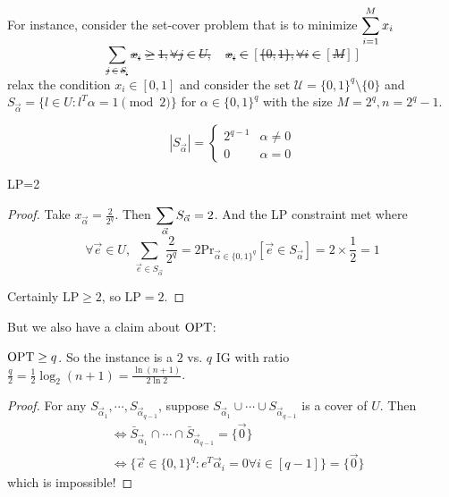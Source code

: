 For instance, consider the set-cover problem that is to minimize  $ \displaystyle\sum_{i=1}^M x_i $ \st 
\[\sum_{j\in S_i}x_i \geq 1,\forall j\in U,\quad x_i\in [\{0,1\},\forall i\in [M]]\] 
relax the condition  $ x_i\in [0,1] $ and consider the set  $ \mathcal{U}=\{0,1\}^q\setminus\{0\} $ and  $ S_{\vec{\alpha}}=\{l\in U:l^T\alpha=1\pmod 2\} $ for  $ \alpha\in \{0,1\}^q $ with the size  $  M=2^q,n=2^q-1 $. 

\[|S_{\vec{\alpha}}|=\begin{cases}
    2^{q-1}&\alpha\neq 0\\
    0&\alpha=0
\end{cases}\]

\begin{claim}
    LP=2
\end{claim}
\begin{proof}
    Take  $ x_{\vec{\alpha}}=\frac{2}{2^q} $. Then  $ \displaystyle\sum_{\vec{\alpha}}S_{\vec{\alpha}}=2 $. And the LP constraint met where
    \[\forall \vec{e}\in U,\,\sum_{\vec{e}\in S_{\vec{\alpha}}}\frac{2}{2^q}=2\mathrm{Pr}_{\vec{\alpha}\in \{0,1\}^q}[\vec{e}\in S_{\vec{\alpha}}]=2\times \frac{1}{2}=1\] 
    
    Certainly  $ \mathrm{LP} \geq 2 $, so  $ \mathrm{LP}=2 $.  
\end{proof}

But we also have a claim about  $ \mathrm{OPT} $:

\begin{claim}
     $ \mathrm{OPT} \geq q $. So the instance is a  $ 2 $ vs.  $ q $ IG with ratio  $ \frac{q}{2}=\frac{1}{2}\log_2(n+1)=\frac{\ln(n+1)}{2\ln 2} $.   
\end{claim}
\begin{proof}
    For any  $ S_{\vec{\alpha}_1},\cdots,S_{\vec{\alpha}_{q-1}} $, suppose  $ S_{\vec{\alpha}_1}\cup\cdots\cup S_{\vec{\alpha}_{q-1}} $ is a cover of  $ U $. Then 
    \begin{align*}
        &\Leftrightarrow \bar{S}_{\vec{\alpha}_1}\cap\cdots\cap\bar{S}_{\vec{\alpha}_{q-1}}=\{\vec{0}\}\\
        &\Leftrightarrow\{\vec{e}\in \{0,1\}^q:e^T\vec{\alpha}_i=0\forall i\in [q-1]\}=\{\vec{0}\}
    \end{align*} 
    which is impossible!
\end{proof}